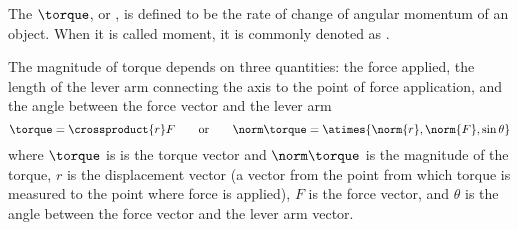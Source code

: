 \begin{module}[id=torque]
  \begin{definition}
    The  $\torque$,  or , is defined to be the rate of change of angular momentum of an
    object. When it is called moment, it is commonly denoted as
    \notatiendum{$\torque[moment]$}.
  \end{definition}

  \begin{omtext}
    The magnitude of torque depends on three quantities: the force applied, the length of
    the lever arm connecting the axis to the point of force application, and the angle
    between the force vector and the lever arm
    \[\torque=\crossproduct{r}F\qquad\text{or}\qquad
    \norm\torque=\atimes{\norm{r},\norm{F},\sin\theta}
    \]
    where $\torque$ is is the torque vector and $\norm\torque$ is the magnitude of the
    torque, $r$ is the displacement vector (a vector from the point from which torque is
    measured to the point where force is applied), $F$ is the force vector, and $\theta$
    is the angle between the force vector and the lever arm vector.
  \end{omtext}
\end{module}
